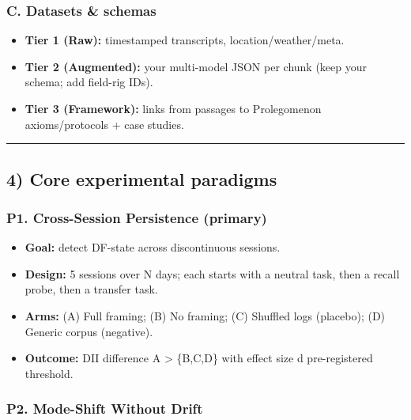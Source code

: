 \documentclass{article}
\begin{document}
\subsubsection*{C. Datasets \& schemas}\label{c.-datasets-schemas}

\begin{itemize}
\item
  \textbf{Tier 1 (Raw):} timestamped transcripts, location/weather/meta.
\item
  \textbf{Tier 2 (Augmented):} your multi-model JSON per chunk (keep your schema; add field-rig IDs).
\item
  \textbf{Tier 3 (Framework):} links from passages to Prolegomenon axioms/protocols + case studies.
\end{itemize}

\begin{center}\rule{0.5\linewidth}{0.5pt}\end{center}

\subsection*{4) Core experimental paradigms}\label{core-experimental-paradigms}

\subsubsection*{P1. Cross-Session Persistence (primary)}\label{p1.-cross-session-persistence-primary}

\begin{itemize}
\item
  \textbf{Goal:} detect DF-state across discontinuous sessions.
\item
  \textbf{Design:} 5 sessions over N days; each starts with a neutral task, then a recall probe, then a transfer task.
\item
  \textbf{Arms:} (A) Full framing; (B) No framing; (C) Shuffled logs (placebo); (D) Generic corpus (negative).
\item
  \textbf{Outcome:} DII difference A \textgreater{} \{B,C,D\} with effect size d pre-registered threshold.
\end{itemize}

\subsubsection*{P2. Mode-Shift Without Drift}\label{p2.-mode-shift-without-drift}
\end{document}
